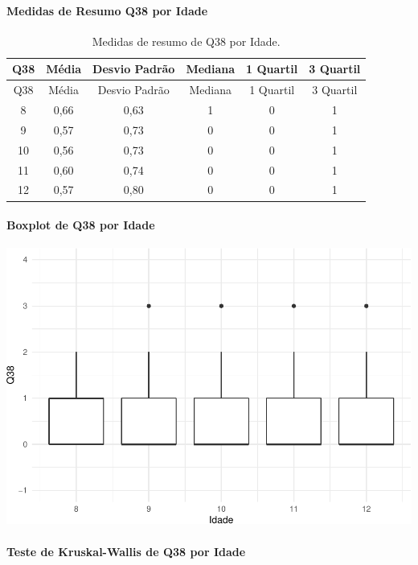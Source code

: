 \documentclass[]{article}
\let\oldparagraph\paragraph
\renewcommand{\paragraph}[1]{\oldparagraph{#1}\mbox{}}
\begin{document}
\cleardoublepage

\hypertarget{medidas-de-resumo-q38-por-idade}{%
\paragraph{Medidas de Resumo Q38 por Idade}\label{medidas-de-resumo-q38-por-idade}}

\begin{longtable}[]{@{}cccccc@{}}
\caption{\label{tab:unnamed-chunk-1453}Medidas de resumo de Q38 por Idade.}\tabularnewline
\toprule
Q38 & Média & Desvio Padrão & Mediana & 1 Quartil & 3 Quartil\tabularnewline
\midrule
\endfirsthead
\toprule
Q38 & Média & Desvio Padrão & Mediana & 1 Quartil & 3 Quartil\tabularnewline
\midrule
\endhead
8 & 0,66 & 0,63 & 1 & 0 & 1\tabularnewline
9 & 0,57 & 0,73 & 0 & 0 & 1\tabularnewline
10 & 0,56 & 0,73 & 0 & 0 & 1\tabularnewline
11 & 0,60 & 0,74 & 0 & 0 & 1\tabularnewline
12 & 0,57 & 0,80 & 0 & 0 & 1\tabularnewline
\bottomrule
\end{longtable}

\hypertarget{boxplot-de-q38-por-idade}{%
\paragraph{Boxplot de Q38 por Idade}\label{boxplot-de-q38-por-idade}}

\begin{center}\includegraphics[width=0.75\linewidth]{relatorio_covid19_files/figure-latex/unnamed-chunk-1454-1} \end{center}

\hypertarget{teste-de-kruskal-wallis-de-q38-por-idade}{%
\paragraph{Teste de Kruskal-Wallis de Q38 por Idade}\label{teste-de-kruskal-wallis-de-q38-por-idade}}
\end{document}
